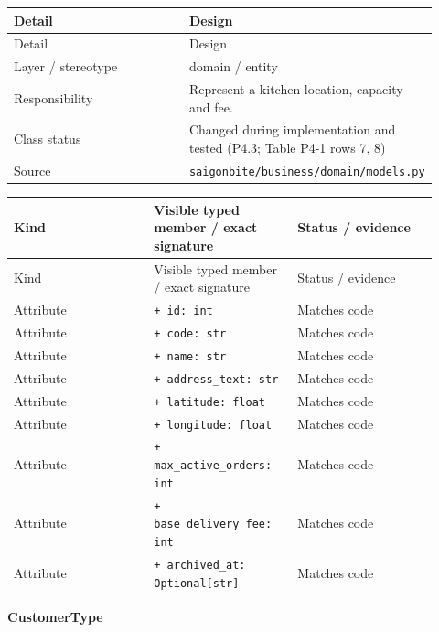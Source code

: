 \begin{longtable}{>{\raggedright\arraybackslash}p{0.4600\linewidth}>{\raggedright\arraybackslash}p{0.4600\linewidth}}
Detail & Design \\
\hline\endfirsthead
Detail & Design \\
\hline\endhead
Layer / stereotype & domain / \guillemotleft{}entity\guillemotright{} \\
Responsibility & Represent a kitchen location, capacity and fee. \\
Class status & Changed during implementation and tested (P4.3; Table P4-1 rows 7, 8) \\
Source & \texttt{saigonbite/\allowbreak{}business/\allowbreak{}domain/\allowbreak{}models.\allowbreak{}py} \\
\end{longtable}
\begin{longtable}{>{\raggedright\arraybackslash}p{0.3067\linewidth}>{\raggedright\arraybackslash}p{0.3067\linewidth}>{\raggedright\arraybackslash}p{0.3067\linewidth}}
Kind & Visible typed member / exact signature & Status / evidence \\
\hline\endfirsthead
Kind & Visible typed member / exact signature & Status / evidence \\
\hline\endhead
Attribute & \texttt{+ id: int} & Matches code \\
Attribute & \texttt{+ code: str} & Matches code \\
Attribute & \texttt{+ name: str} & Matches code \\
Attribute & \texttt{+ address\_\allowbreak{}text: str} & Matches code \\
Attribute & \texttt{+ latitude: float} & Matches code \\
Attribute & \texttt{+ longitude: float} & Matches code \\
Attribute & \texttt{+ max\_\allowbreak{}active\_\allowbreak{}orders: int} & Matches code \\
Attribute & \texttt{+ base\_\allowbreak{}delivery\_\allowbreak{}fee: int} & Matches code \\
Attribute & \texttt{+ archived\_\allowbreak{}at: Optional[str]} & Matches code \\
\end{longtable}
\textbf{CustomerType}

